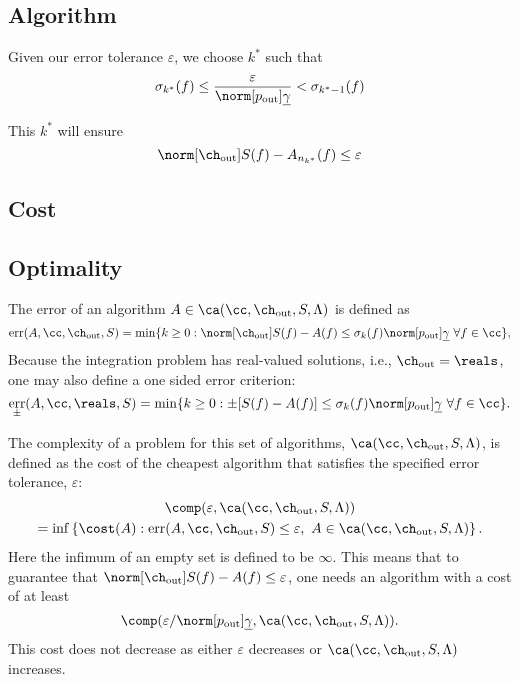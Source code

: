 \documentclass[final]{elsarticle}
\newcommand{\chout}{\ch_{\text{\rm{out}}}}
\newcommand{\pout}{p_{\text{\rm{out}}}}
\DeclareMathOperator{\err}{err}
\theoremstyle{definition}
\theoremstyle{remark}
\begin{document}
\subsection{Algorithm}

Given our error tolerance $\varepsilon$, we choose $k^*$ such that
\begin{equation}
\sigma_{k^*}(f) \le \frac{\varepsilon}{\norm[\pout]{\underline{\gamma}}} < \sigma_{k^*-1}(f)
\end{equation}

This $k^*$ will ensure
\begin{equation}
\norm[\chout]{S(f)-A_{n_{k^*}}(f)} \le \varepsilon
\end{equation}

\subsection{Cost}

\subsection{Optimality}

The error of an algorithm $A  \in \ca(\cc,\chout,S,\Lambda)$ is defined  as
\begin{equation} \label{errdefworst}
\err(A,\cc,\chout,S)
= \min\{ k \ge 0 : \norm[\chout]{S(f) -  A(f)} \le \sigma_{k}(f) \norm[\pout]{\underline{\gamma}} \ \forall f \in \cc \},
\end{equation}
Because the integration problem has real-valued solutions, i.e., $\chout=\reals$, one may also define a one sided error criterion:
\begin{equation}\label{errpmdefworst}
\err_{\pm}(A,\cc,\reals,S) =
\min \{ k \ge 0 : \pm[S(f) -  A(f)] \le \sigma_{k}(f) \norm[\pout]{\underline{\gamma}} \ \forall f \in \cc \}.
\end{equation}

The complexity of a problem for this set of algorithms, $\ca(\cc,\chout,S,\Lambda)$, is defined as the cost of the cheapest algorithm that satisfies the specified error tolerance, $\varepsilon$:
\begin{multline} \label{fixcostcomplex}
\comp(\varepsilon,\ca(\cc,\chout,S,\Lambda)) \\
= \inf\left\{\cost(A) : \err(A,\cc,\chout,S) \le \varepsilon, \ A  \in \ca(\cc,\chout,S,\Lambda) \right \}.
\end{multline}
Here the infimum of an empty set is defined to be $\infty$.  This means that to guarantee that $\norm[\chout]{S(f) -  A(f)} \le \varepsilon$, one needs an algorithm with a cost of at least
\[
\comp(\varepsilon/\norm[\pout]{\underline{\gamma}},\ca(\cc,\chout,S,\Lambda)).
\]
This cost does not decrease as either $\varepsilon$ decreases or $\ca(\cc,\chout,S,\Lambda)$ increases.
\end{document}
